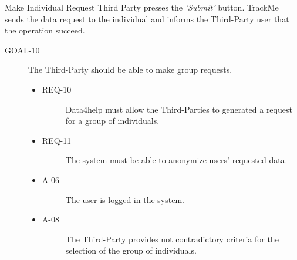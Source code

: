 \documentclass[a4paper]{article}
\newcommand{\requirement}{\ding{229}}%
\begin{document}
        \begin{usecase}{ Make Individual Request}
        {Third Party presses the \textit{'Submit'} button.}
        {TrackMe sends the data request to the individual and informs the Third-Party user that the operation succeed.}
        \end{usecase}
        
        \begin{description}
        	\item[GOAL-10] The Third-Party should be able to make group requests. 
            	\begin{itemize}
            	    \item[\requirement]
                	\begin{description}
                	\item[REQ-10] Data4help must allow the Third-Parties to generated a request for a group of individuals. 
                	\end{description}
                	\item[\requirement]
                	\begin{description}
                	\item[REQ-11] The system must be able to anonymize users' requested data. 
                	\end{description}
                	\item
                	\begin{description}
                	\item[A-06] The user is logged in the system.
                	\end{description}
                	\item
                	\begin{description}
                	\item[A-08] The Third-Party provides not contradictory criteria for the selection of the group of individuals.
                	\end{description}
                	\end{itemize}
        \end{description}
        
\end{document}
